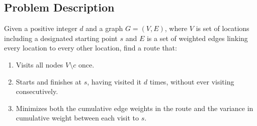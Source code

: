 \subsection{Problem Description}\label{subsec:problem-description}
Given a positive integer $d$ and a graph $G = (V, E)$, where $V$ is set of locations including a designated
starting point $s$ and $E$ is a set of weighted edges linking every location to every other location, find a route
that:
\begin{enumerate}
    \item Visits all nodes $V \setminus c$ once.
    \item Starts and finishes at $s$, having visited it $d$ times, without ever visiting consecutively.
    \item Minimizes both the cumulative edge weights in the route and the variance in cumulative weight between
    each visit to $s$.
\end{enumerate}

